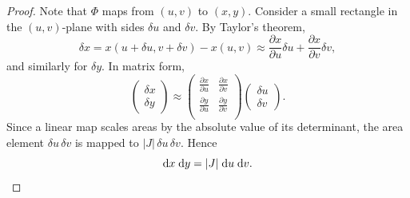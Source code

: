 \documentclass[a4paper]{article}
\begin{document}
\begin{proof}
  Note that $\Phi$ maps from $(u, v)$ to $(x, y)$. Consider a small rectangle in the $(u, v)$-plane with sides $\delta u$ and $\delta v$. By Taylor's theorem,
  \[
    \delta x = x(u + \delta u, v + \delta v) - x(u, v) \approx \frac{\partial x}{\partial u}\delta u + \frac{\partial x}{\partial v}\delta v,
  \]
  and similarly for $\delta y$. In matrix form,
  \[
    \begin{pmatrix}
      \delta x\\
      \delta y
    \end{pmatrix}
    \approx
    \begin{pmatrix}
      \frac{\partial x}{\partial u} & \frac{\partial x}{\partial v}\\
      \frac{\partial y}{\partial u} & \frac{\partial y}{\partial v}\\
    \end{pmatrix}
    \begin{pmatrix}
      \delta u\\
      \delta v
    \end{pmatrix}.
  \]
  Since a linear map scales areas by the absolute value of its determinant, the area element $\delta u\,\delta v$ is mapped to $|J|\,\delta u\,\delta v$. Hence
  \[
    \mathrm{d} x\;\mathrm{d} y = |J| \;\mathrm{d} u\;\mathrm{d} v.\qedhere
  \]
\end{proof}
\end{document}
